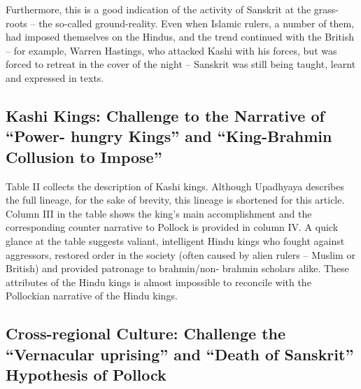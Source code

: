 \begin{enumerate}
\vspace{0.1cm}

 Furthermore, this is a good indication of the activity of Sanskrit at the grass-roots – the so-called ground-reality. Even when Islamic rulers, a number of them, had imposed themselves on the Hindus, and the trend continued with the British – for example, Warren Hastings, who attacked Kashi with his forces, but was forced to retreat in the cover of the night – Sanskrit was still being taught, learnt and expressed in texts.
\end{enumerate}


\newpage

\subsection*{Kashi Kings: \hfill\break Challenge to the Narrative of “Power- hungry Kings” \hfill\break and “King-Brahmin Collusion to Impose”}

Table II collects the description of Kashi kings. Although Upadhyaya describes the full lineage, for the sake of brevity, this lineage is shortened for this article. Column III in the table shows the king’s main accomplishment and the corresponding counter narrative to Pollock is provided in column IV. A quick glance at the table suggests valiant, intelligent Hindu kings who fought against aggressors, restored order in the society (often caused by alien rulers – Muslim or British) and provided patronage to brahmin/non- brahmin scholars alike. These attributes of the Hindu kings is almost impossible to reconcile with the Pollockian narrative of the Hindu kings.

\vspace{-.3cm}

\subsection*{Cross-regional Culture: \hfill\break Challenge the “Vernacular uprising” and \hfill\break “Death of Sanskrit” Hypothesis of Pollock}

\vspace{-.2cm}

